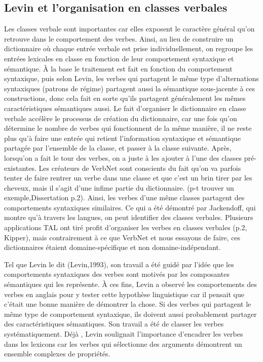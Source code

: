 \documentclass[12pt,maitrise,frenchb,natbib,twoside,initial]{dms}
\numberwithin{equation}{section}
\numberwithin{table}{chapter}
\numberwithin{figure}{chapter}
\begin{document}
\subsection{Levin et l'organisation en classes verbales}

Les classes verbale sont importantes car elles exposent le caractère général qu'on retrouve dans le comportement des verbes. Ainsi, au lieu de construire un dictionnaire où chaque entrée verbale est prise individuellement, on regroupe les entrées lexicales en classe en fonction de leur comportement syntaxique et sémantique. À la base le traitement est fait en fonction du comportement syntaxique, puis selon Levin, les verbes qui partagent le même type d'alternations syntaxiques (patrons de régime) partagent aussi la sémantique sous-jacente à ces constructions, donc cela fait en sorte qu'ils partagent généralement les mêmes caractéristiques sémantiques aussi. Le fait d'organiser le dictionnaire en classe verbale accélère le processus de création du dictionnaire, car une fois qu'on détermine le nombre de verbes qui fonctionnent de la même manière, il ne reste plus qu'à faire une entrée qui retient l'information syntaxique et sémantique partagée par l'ensemble de la classe, et passer à la classe suivante. Après, lorsqu'on a fait le tour des verbes, on a juste à les ajouter à l'une des classes pré-existantes. Les créateurs de VerbNet sont conscients du fait qu'on va parfois tenter de faire rentrer un verbe dans une classe et que c'est un brin tirer par les cheveux, mais il s'agit d'une infime partie du dictionnaire. (p-t trouver un exemple,Dissertation p.2). Ainsi, les verbes d'une même classes partagent des comportements syntaxiques similaires. Ce qui a été démontré par Jackendoff, qui montre qu'à travers les langues, on peut identifier des classes verbales. Plusieurs applications TAL ont tiré profit d'organiser les verbes en classes verbales (p.2, Kipper), mais contrairement à ce que VerbNet et nous essayons de faire, ces dictionnaires étaient domaine-spécifique et non domaine-indépendant.

Tel que Levin le dit (Levin,1993), son travail a été guidé par l'idée que les comportements syntaxiques des verbes sont motivés par les composantes sémantiques qui les représente. À ces fins, Levin a observé les comportements des verbes en anglais pour y tester cette hypothèse linguistique car il pensait que c'était une bonne manière de démontrer la chose. Si des verbes qui partagent le même type de comportement syntaxique, ils doivent aussi probablement partager des caractéristiques sémantiques. Son travail a été de classer les verbes systématiquement. Déjà , Levin soulignait l'importance d'encadrer les verbes dans les lexicons car les verbes qui sélectionne des arguments démontrent un ensemble complexes de propriétés.
\end{document}
